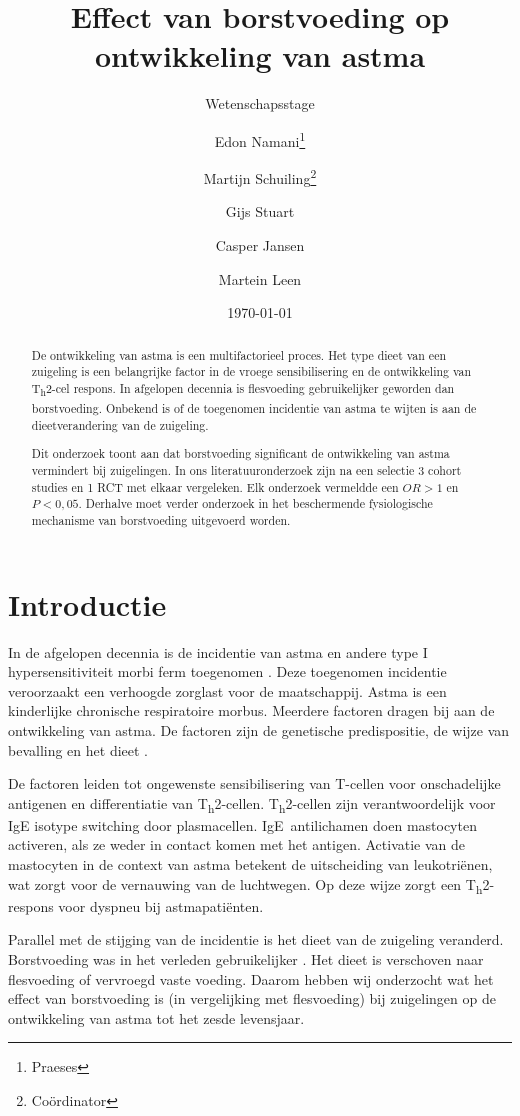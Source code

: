 \documentclass[abstract=true]{scrartcl}
\title{Effect van borstvoeding op ontwikkeling van astma}
\subtitle{Wetenschapsstage}
\author{Edon Namani\thanks{Praeses} \and Martijn Schuiling\thanks{Co\"ordinator} \and Gijs Stuart \and Casper Jansen \and Martein Leen}
\date{\today}
\begin{document}
\maketitle
    \begin{abstract}
        De ontwikkeling van astma is een multifactorieel proces. Het type dieet van een zuigeling is een belangrijke factor in de vroege sensibilisering en de ontwikkeling van T\textsubscript{h}2-cel respons. In afgelopen decennia is flesvoeding gebruikelijker geworden dan borstvoeding. Onbekend is of de toegenomen incidentie van astma te wijten is aan de dieetverandering van de zuigeling. 
        
        Dit onderzoek toont aan dat borstvoeding significant de ontwikkeling van astma vermindert bij zuigelingen. In ons literatuuronderzoek zijn na een selectie 3 cohort studies en 1 RCT met elkaar vergeleken. Elk onderzoek vermeldde een $OR > 1$ en $P < 0,05$. Derhalve moet verder onderzoek in het beschermende fysiologische mechanisme van borstvoeding uitgevoerd worden.
    \end{abstract}

\section{Introductie}
In de afgelopen decennia is de incidentie van astma en andere type I hypersensitiviteit morbi ferm toegenomen \cite{Platts_Mills_2015}. Deze toegenomen incidentie veroorzaakt een verhoogde zorglast voor de maatschappij. Astma is een kinderlijke chronische respiratoire morbus. Meerdere factoren dragen bij aan de ontwikkeling van astma. De factoren zijn de genetische predispositie, de wijze van bevalling en het dieet \cite{abbas2017cellular,Houghteling_2015}.

De factoren leiden tot ongewenste sensibilisering van T-cellen voor onschadelijke antigenen en differentiatie van T\textsubscript{h}2-cellen. T\textsubscript{h}2-cellen zijn verantwoordelijk voor IgE isotype switching door plasmacellen. IgE~antilichamen doen mastocyten activeren, als ze weder in contact komen met het antigen. Activatie van de mastocyten in de context van astma betekent de uitscheiding van leukotriënen, wat zorgt voor de vernauwing van de luchtwegen. Op deze wijze zorgt een T\textsubscript{h}2-respons voor dyspneu bij astmapatiënten.

Parallel met de stijging van de incidentie is het dieet van de zuigeling veranderd. Borstvoeding was in het verleden gebruikelijker \cite{world1981contemporary,Victora_2016,Rollins_2016}. Het dieet is verschoven naar flesvoeding of vervroegd vaste voeding. Daarom hebben wij onderzocht wat het effect van borstvoeding is (in vergelijking met flesvoeding) bij zuigelingen op de ontwikkeling van astma tot het zesde levensjaar.
\end{document}
